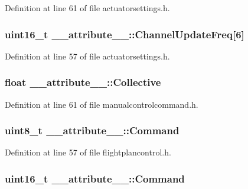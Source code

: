 \-Definition at line 61 of file actuatorsettings.\-h.

\hypertarget{struct____attribute_____af87e63d51524ec0e92ea666f56a34653}{
\subsubsection[{\-Channel\-Update\-Freq}]{\setlength{\rightskip}{0pt plus 5cm}uint16\-\_\-t {\bf \-\_\-\-\_\-attribute\-\_\-\-\_\-\-::\-Channel\-Update\-Freq}\mbox{[}6\mbox{]}}}\label{struct____attribute_____af87e63d51524ec0e92ea666f56a34653}


\-Definition at line 57 of file actuatorsettings.\-h.

\hypertarget{struct____attribute_____aba158570e3e3e7c7b0aa4932e9b43b51}{
\subsubsection[{\-Collective}]{\setlength{\rightskip}{0pt plus 5cm}float {\bf \-\_\-\-\_\-attribute\-\_\-\-\_\-\-::\-Collective}}}\label{struct____attribute_____aba158570e3e3e7c7b0aa4932e9b43b51}


\-Definition at line 61 of file manualcontrolcommand.\-h.

\hypertarget{struct____attribute_____ae0af8d68998463a6da984d8a7cc9c57f}{
\subsubsection[{\-Command}]{\setlength{\rightskip}{0pt plus 5cm}uint8\-\_\-t {\bf \-\_\-\-\_\-attribute\-\_\-\-\_\-\-::\-Command}}}\label{struct____attribute_____ae0af8d68998463a6da984d8a7cc9c57f}


\-Definition at line 57 of file flightplancontrol.\-h.

\hypertarget{struct____attribute_____af7007d29612482dce21e79e4db0fd2b8}{
\subsubsection[{\-Command}]{\setlength{\rightskip}{0pt plus 5cm}uint16\-\_\-t {\bf \-\_\-\-\_\-attribute\-\_\-\-\_\-\-::\-Command}}}\label{struct____attribute_____af7007d29612482dce21e79e4db0fd2b8}


